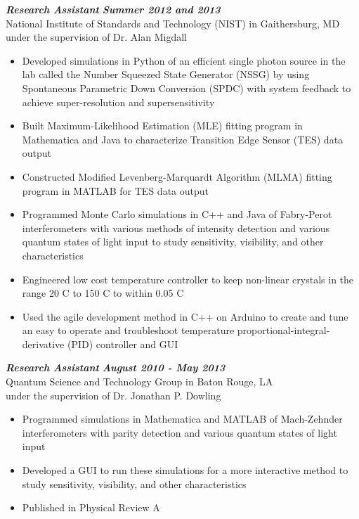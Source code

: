 \documentclass{res}
\begin{document}
\begin{resume}
        {\bfseries {\em Research Assistant}} \hfill {\bfseries{\em Summer 2012 and 2013}} \\
National Institute of Standards and Technology (NIST) in Gaithersburg, MD \\
                 under the supervision of Dr. Alan Migdall
                 \begin{itemize}  \itemsep -2pt %
                 \item Developed simulations in Python of an efficient single photon source in the lab called the Number Squeezed State Generator (NSSG) by using Spontaneous Parametric Down Conversion (SPDC) with system feedback to achieve super-resolution and supersensitivity
		\item Built Maximum-Likelihood Estimation (MLE) fitting program in Mathematica and Java to characterize Transition Edge Sensor (TES) data output
	 	\item Constructed Modified Levenberg-Marquardt Algorithm (MLMA) fitting program in MATLAB for TES data output
	 	\item Programmed Monte Carlo simulations in C++ and Java of Fabry-Perot interferometers with various methods of intensity detection and various quantum states of light input to study sensitivity, visibility, and other characteristics
		\item Engineered low cost temperature controller to keep non-linear crystals in the range 20 C to 150 C to within 0.05 C
	 	\item Used the agile development method in C++ on Arduino to create and tune an easy to operate and troubleshoot temperature proportional-integral-derivative (PID) controller and GUI 
                 \end{itemize}
	{\bfseries {\em  Research Assistant}}  \hfill  {\bfseries{\em August 2010 - May 2013}} \\
		Quantum Science and Technology Group in Baton Rouge, LA \\                 
                 under the supervision of Dr. Jonathan P. Dowling
                 \begin{itemize}  \itemsep -2pt %
		\item Programmed simulations in Mathematica and MATLAB of Mach-Zehnder \\ interferometers with parity detection and various quantum states of light input
		\item Developed a GUI to run these simulations for a more interactive method to study sensitivity, visibility, and other characteristics 
		\item Published in Physical Review A
                 \end{itemize}


\end{resume}
\end{document}
